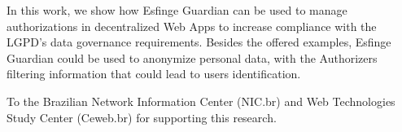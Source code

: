 \documentclass[sigconf]{acmart}
\begin{document}
In this work, we show how Esfinge Guardian can be used to manage authorizations in decentralized Web Apps to increase compliance with the LGPD's data governance requirements. Besides the offered examples, Esfinge Guardian could be used to anonymize personal data, with the Authorizers filtering information that could lead to users identification.

%
\begin{acks}
To the Brazilian Network Information Center (NIC.br) and Web Technologies Study Center (Ceweb.br) for supporting this research.
\end{acks}

%


\end{document}
